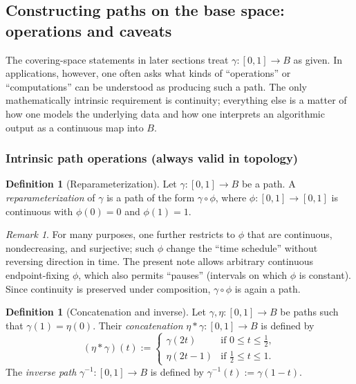 \documentclass[11pt,a4paper]{article}
\theoremstyle{definition}
\newtheorem{definition}[theorem]{Definition}
\theoremstyle{remark}
\newtheorem{remark}[theorem]{Remark}
\begin{document}
\subsection{Constructing paths on the base space: operations and caveats}
\label{sec:constructing-paths}

The covering-space statements in later sections treat \(\gamma:[0,1]\to B\) as given. In applications, however, one often asks what kinds of ``operations'' or ``computations'' can be understood as producing such a path. The only mathematically intrinsic requirement is continuity; everything else is a matter of how one models the underlying data and how one interprets an algorithmic output as a continuous map into \(B\).

\subsubsection{Intrinsic path operations (always valid in topology)}
\label{sec:intrinsic-path-ops}

\begin{definition}[Reparameterization]
\label{def:reparameterization}
Let \(\gamma:[0,1]\to B\) be a path. A \emph{reparameterization} of \(\gamma\) is a path of the form \(\gamma\circ \phi\), where \(\phi:[0,1]\to[0,1]\) is continuous with \(\phi(0)=0\) and \(\phi(1)=1\).
\end{definition}

\begin{remark}
\label{rem:reparameterization}
For many purposes, one further restricts to \(\phi\) that are continuous, nondecreasing, and surjective; such \(\phi\) change the ``time schedule'' without reversing direction in time. The present note allows arbitrary continuous endpoint-fixing \(\phi\), which also permits ``pauses'' (intervals on which \(\phi\) is constant). Since continuity is preserved under composition, \(\gamma\circ\phi\) is again a path.
\end{remark}

\begin{definition}[Concatenation and inverse]
\label{def:concat-inverse}
Let \(\gamma,\eta:[0,1]\to B\) be paths such that \(\gamma(1)=\eta(0)\). Their \emph{concatenation} \(\eta * \gamma:[0,1]\to B\) is defined by
\[
(\eta * \gamma)(t):=
\begin{cases}
\gamma(2t) & \text{if } 0\le t\le \tfrac12,\\
\eta(2t-1) & \text{if } \tfrac12\le t\le 1.
\end{cases}
\]
The \emph{inverse path} \(\gamma^{-1}:[0,1]\to B\) is defined by \(\gamma^{-1}(t):=\gamma(1-t)\).
\end{definition}
\end{document}
